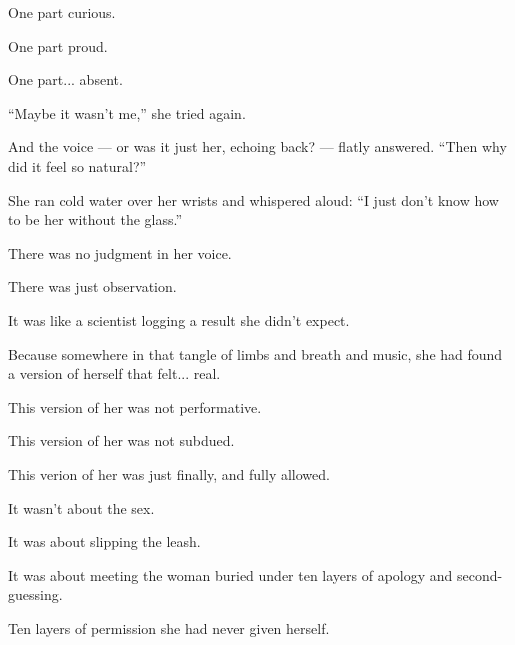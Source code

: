 One part curious. 

One part proud.

One part... absent.

``Maybe it wasn’t me,'' she tried again.

And the voice --- or was it just her, echoing back? --- flatly answered.
``Then why did it feel so natural?''

She ran cold water over her wrists and whispered aloud:
``I just don’t know how to be her without the glass.''

There was no judgment in her voice. 

There was just observation. 

It was like a scientist logging a result she didn’t expect.

Because somewhere in that tangle of limbs and breath and music, she had found a 
version of herself that 
felt... real.

This version of her was not performative. 

This version of her was not subdued. 

This verion of her was just finally, and fully allowed.

It wasn’t about the sex.

It was about slipping the leash.

It was about meeting the woman buried under ten layers of apology and second-guessing.

Ten layers of permission she had never given herself.

